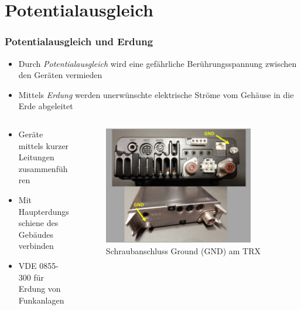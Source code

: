 
\section{Potentialausgleich}
\label{section:blitzschutz}
\begin{frame}%

\frametitle{Potentialausgleich und Erdung}
\begin{itemize}
  \item Durch \emph{Potentialausgleich} wird eine gefährliche Berührungsspannung zwischen den Geräten vermieden
  \item Mittels \emph{Erdung} werden unerwünschte elektrische Ströme vom Gehäuse in die Erde abgeleitet
  \end{itemize}
\end{frame}

\begin{frame}
\begin{columns}
    \begin{column}{0.48\textwidth}
    \begin{itemize}
  \item Geräte mittels kurzer Leitungen zusammenführen
  \item Mit Haupterdungsschiene des Gebäudes verbinden
  \item VDE 0855-300 für Erdung von Funkanlagen
  \end{itemize}

    \end{column}
   \begin{column}{0.48\textwidth}
       
\begin{figure}
    \includegraphics[width=0.85\textwidth]{foto/81}
    \caption{\scriptsize Schraubanschluss Ground (GND) am TRX}
    \label{n_Schraubanschluss_GND}
\end{figure}

   \end{column}
\end{columns}

\end{frame}

